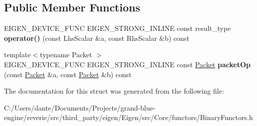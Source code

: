\subsection*{Public Member Functions}
\begin{DoxyCompactItemize}
\item 
\mbox{\label{struct_eigen_1_1internal_1_1scalar__difference__op_a4e65670cc723d0a01418458ee3cdeaed}} 
E\+I\+G\+E\+N\+\_\+\+D\+E\+V\+I\+C\+E\+\_\+\+F\+U\+NC E\+I\+G\+E\+N\+\_\+\+S\+T\+R\+O\+N\+G\+\_\+\+I\+N\+L\+I\+NE const result\+\_\+type {\bfseries operator()} (const Lhs\+Scalar \&a, const Rhs\+Scalar \&b) const
\item 
\mbox{\label{struct_eigen_1_1internal_1_1scalar__difference__op_a11b257b9902b537a1d322609c150ced4}} 
{\footnotesize template$<$typename Packet $>$ }\\E\+I\+G\+E\+N\+\_\+\+D\+E\+V\+I\+C\+E\+\_\+\+F\+U\+NC E\+I\+G\+E\+N\+\_\+\+S\+T\+R\+O\+N\+G\+\_\+\+I\+N\+L\+I\+NE const \mbox{\hyperlink{union_eigen_1_1internal_1_1_packet}{Packet}} {\bfseries packet\+Op} (const \mbox{\hyperlink{union_eigen_1_1internal_1_1_packet}{Packet}} \&a, const \mbox{\hyperlink{union_eigen_1_1internal_1_1_packet}{Packet}} \&b) const
\end{DoxyCompactItemize}


The documentation for this struct was generated from the following file\+:\begin{DoxyCompactItemize}
\item 
C\+:/\+Users/dante/\+Documents/\+Projects/grand-\/blue-\/engine/reverie/src/third\+\_\+party/eigen/\+Eigen/src/\+Core/functors/Binary\+Functors.\+h\end{DoxyCompactItemize}
